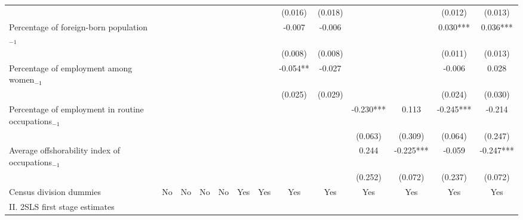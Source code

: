 \begin{frame}
\begin{table}[ht]
{\begin{tabular}{lcccccccccccc}
                &             &            &             &            &            &             & (0.016)     & (0.018)    &             &            & (0.012)     & (0.013)    \\
Percentage of foreign-born population$_{-1}$        
                &             &            &             &            &            &             & -0.007      & -0.006     &             &            & 0.030***    & 0.036***   \\
                &             &            &             &            &            &             & (0.008)     & (0.008)    &             &            & (0.011)     & (0.013)    \\
Percentage of employment among women$_{-1}$         
                &             &            &             &            &            &             & -0.054**    & -0.027     &             &            & -0.006      & 0.028      \\
                &             &            &             &            &            &             & (0.025)     & (0.029)    &             &            & (0.024)     & (0.030)    \\
Percentage of employment in routine occupations$_{-1}$   
                &             &            &             &            &             &            &             &            & -0.230***   & 0.113      & -0.245***   & -0.214     \\
                &             &            &             &            &             &            &             &            & (0.063)     & (0.309)    & (0.064)     & (0.247)    \\
Average offshorability index of occupations$_{-1}$  
                &             &            &             &            &             &            &             &            & 0.244       & -0.225***  & -0.059      & -0.247***  \\
                &             &            &             &            &             &            &             &            & (0.252)     & (0.072)    & (0.237)     & (0.072)    \\
Census division dummies                               
                & No          & No         & No          & No         & Yes         & Yes        & Yes         & Yes        & Yes         & Yes        & Yes         & Yes        \\
                \multicolumn{13}{l}{II. 2SLS first stage estimates} \\
                \midrule

\end{tabular}}
\end{table}
\end{frame}
